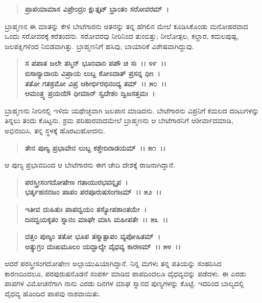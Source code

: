 \begin{verse}
\textbf{ಪ್ರಾಪಯಾಮಾಸ ವಿಪ್ರೇಂದ್ರಂ ಕ್ಷುತ್ತೃಟ್ ಭ್ರಾಂತಂ ಸರೋವರಮ್~।}
\end{verse}

ಬ್ರಾಹ್ಮಣನ ಈ ಮಾತನ್ನು ಕೇಳಿ ಬೇಟೆಗಾರನು ಆತನನ್ನು ತನ್ನ ಹೆಗಲಿನ ಮೇಲೆ ಕೂಡಿಸಿಕೊಂಡು ಮನೋಹರವಾದ ಒಂದು ಸರೋವರಕ್ಕೆ ಕರೆತಂದನು. ಸರೋವರವು ನೀರಿನಿಂದ ತುಂಬಿತ್ತು; ನೀಲೋತ್ಪಲ, ಕಲ್ಹಾರ, ಕಮಲಪುಷ್ಪ, ಜಲಪಕ್ಷಿಗಳಿಂದ ನಿಬಿಡವಾಗಿತ್ತು. ಬ್ರಾಹ್ಮಣನಿಗೆ ಹಸಿವು, ಬಾಯಾರಿಕೆ ವಿಶೇಷವಾಗಿದ್ದುವು.

\begin{verse}
\textbf{ಸ ಪಪಾತ ಜಲೇ ತಸ್ಮಿನ್ ಭೂರಿವಾರಿ ಪಪೌ ಚ ಸಃ~।। ೪೯~।।} \\\textbf{ಬಿಸಾನ್ಯಾದಾಯ ವಿಪ್ರಾಯ ಲುಬ್ದ ಕೋಽದಾತ್ ಪ್ರಸನ್ನ ಧೀಃ~।}\\\textbf{ತತೋ ಗತಶ್ರಮೋ ವಿಪ್ರ ಆಶೀರ್ಭಿರಭಿನಂದ್ಯ ತಮ್~।। ೫೦~।। }\\\textbf{ಆಮಂತ್ರ್ಯ ಪ್ರಯಯೆೌ ಧೀಮಾನ್ ಸ್ವದೇಶಂ ದ್ವಿಜಸತ್ತಮಃ~।}
\end{verse}

ಬ್ರಾಹ್ಮಣನು ನೀರಿನಲ್ಲಿ ಇಳಿದು ಯಥೇಚ್ಛವಾಗಿ ಜಲಪಾನ ಮಾಡಿದನು. ಬೇಟೆಗಾರನು ವಿಪ್ರನಿಗೆ ಕಮಲದ ದಂಟುಗಳನ್ನು ತಿನ್ನಲು ತಂದು ಕೊಟ್ಟನು. ಶ್ರಮ ಪರಿಹಾರವಾದಮೇಲೆ ಬ್ರಾಹ್ಮಣನು ಆ ಬೇಟೆಗಾರನಿಗೆ ಆಶೀರ್ವಾದಮಾಡಿ, ಅಭಿನಂದಿಸಿ, ತನ್ನ ಸ್ಥಳಕ್ಕೆ ಹೊರಟು\-ಹೋದನು.

\begin{verse}
\textbf{ತೇನ ಪುಣ್ಯ ಪ್ರಭಾವೇನ ಲುಬ್ದ ಕಶ್ಚೇದಿರಾಡಯಮ್~।। ೫೧~।।}
\end{verse}

ಆ ಪುಣ್ಯ ಪ್ರಭಾವದಿಂದ ಆ ಬೇಟೆಗಾರನು ಈಗ ಚೇದಿ ದೇಶಕ್ಕೆ ರಾಜನಾಗಿದ್ದಾನೆ.

\begin{verse}
\textbf{ಪರಸ್ತ್ರೀಸಂಗದೋಷೇಣ ಗತಾಯುರಭವನ್ನೃಪ~।}\\\textbf{ಭರ್ತೃಹನನಜಂ ಪಾಪಂ ಪರಪೂರುಷಸಂಗಜಮ್~।। ೫೨~।। }
\end{verse}

\begin{verse}
\textbf{ಇತೀವ ದುಹಿತುಃ ಪಾಪದ್ವಯಂ ತಸ್ಯೋಪಶಾಂತಯೇ~।}\\\textbf{ದಿನದ್ವಯಕೃತಂ ಸ್ನಾನಂ ಮಾಘೇ ಮಾಸಿ ಮಹೀಪತೇ~।। ೫೩~।। }
\end{verse}

\begin{verse}
\textbf{ದತ್ತಂ ಪುಣ್ಯಂ ತತೋ ಭೂಪ ತಸ್ಮಾತ್ಪಾಪಂ ವ್ಯಪೋಹಿತಮ್~।}\\\textbf{ಅತ್ಯುಗ್ರಂ ದುಃಖಮೂಲಂ ಯದ್ಬಾಲ್ಯೇ ವೈಧವ್ಯ ಕಾರಣಮ್~।। ೫೪~।।}
\end{verse}

ಆದರೆ ಪರಸ್ತ್ರೀಸಂಗದೋಷೇಣ ಅಲ್ಪಾಯುಷಿಯಾಗಿದ್ದಾನೆ. ನಿನ್ನ ಮಗಳು ತನ್ನ ಪತಿಯನ್ನು ಸಂಹರಿಸಿದ ಕಾರಣದಿಂದಲೂ, ಪರಪುರುಷನೊಡನೆ ಸಂಪರ್ಕ ಮಾಡಿದ ಪಾಪದಿಂದಲೂ ವೈಧವ್ಯವನ್ನು ಪಡೆದಳು. ಈ ಎರಡು ಪಾಪಗಳ ವಿಮೋಚನೆಗಾಗಿ ನಾನು ಎರಡು ದಿನಗಳ ಮಾಘ ಸ್ನಾನದ ಪುಣ್ಯಗಳನ್ನು ಕೊಟ್ಟೆ. ಇದರಿಂದ ಬಾಲ್ಯದಲ್ಲಿ ವೈಧವ್ಯ ಹೊಂದಿದ ಪಾಪವು ನಾಶವಾಯಿತು.

